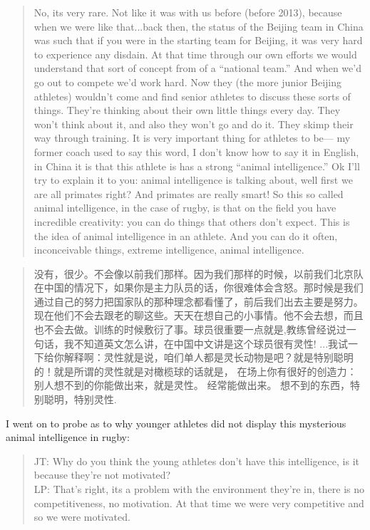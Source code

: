 \begin{CJK}{UTF8}{gbsn}
      \begin{quotation}
        No, its very rare.  Not like it was with us before (before 2013), because when we were like that...back then, the status of the Beijing team in China was such that if you were in the starting team for Beijing, it was very hard to experience any disdain.  At that time through our own efforts we would understand that sort of concept from of a ``national team.'' And when we'd go out to compete we'd work hard.  Now they (the more junior Beijing athletes) wouldn't come and find senior athletes to discuss these sorts of things.  They're thinking about their own little things every day.  They won't think about it, and also they won't go and do it.  They skimp their way through training.  It is very important thing for athletes to be--- my former coach used to say this word, I don't know how to say it in English, in China it is that this athlete is has a strong ``animal intelligence.''
        Ok I'll try to explain it to you: animal intelligence is talking about, well first we are all primates right?  And primates are really smart!  So this so called animal intelligence, in the case of rugby, is that on the field you have incredible creativity: you can do things that others don't expect.  This is the idea of animal intelligence in an athlete.  And you can do it often, inconceivable things, extreme intelligence, animal intelligence.
      \end{quotation}

      \begin{quotation}
        没有，很少。不会像以前我们那样。因为我们那样的时候，以前我们北京队在中国的情况下，如果你是主力队员的话，你很难体会含怒。那时候是我们通过自己的努力把国家队的那种理念都看懂了，前后我们出去主要是努力。现在他们不会去跟老的聊这些。天天在想自己的小事情。他不会去想，而且也不会去做。训练的时候敷衍了事。球员很重要一点就是,教练曾经说过一句话，我不知道英文怎么讲，在中国中文讲是这个球员很有灵性! ...我试一下给你解释啊：灵性就是说，咱们单人都是灵长动物是吧？就是特别聪明的！就是所谓的灵性就是对橄榄球的话就是， 在场上你有很好的创造力：别人想不到的你能做出来，就是灵性。 经常能做出来。 想不到的东西，特别聪明，特别灵性.
      \end{quotation}

I went on to probe as to why younger athletes did not display this mysterious animal intelligence in rugby:

\begin{quotation}
      JT: Why do you think the young athletes don't have this intelligence, is it because they're not motivated? \\
      LP: That's right, its a problem with the environment they're in, there is no competitiveness, no motivation.  At that time we were very competitive and so we were motivated.
\end{quotation}


\end{CJK}
